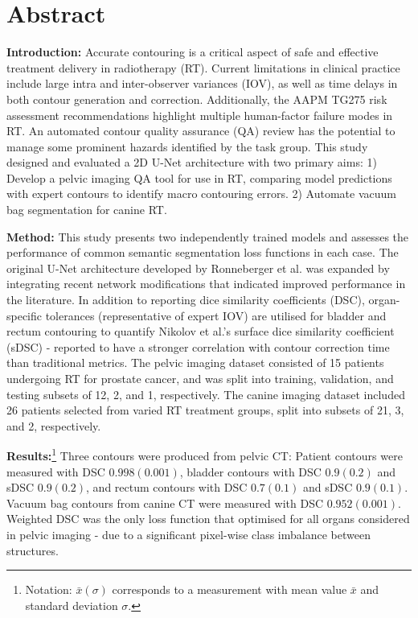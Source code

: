 \chapter{Abstract} \label{ch:abstract}

\textbf{Introduction:}
Accurate contouring is a critical aspect of safe and effective treatment
delivery in radiotherapy (RT). Current limitations in clinical practice include
large intra and inter-observer variances (IOV), as well as time delays in both
contour generation and correction. Additionally, the AAPM TG275 risk assessment
recommendations highlight multiple human-factor failure modes in RT. An
automated contour quality assurance (QA) review has the potential to manage some
prominent hazards identified by the task group. This study designed and
evaluated a 2D U-Net architecture with two primary aims: 1) Develop a pelvic
imaging QA tool for use in RT, comparing model predictions with expert
contours to identify macro contouring errors. 2) Automate vacuum bag
segmentation for canine RT.

\textbf{Method:}
This study presents two independently trained models and assesses the
performance of common semantic segmentation loss functions in each case. The
original U-Net architecture developed by Ronneberger et al. was expanded by
integrating recent network modifications that indicated improved performance in
the literature. In addition to reporting dice similarity coefficients (DSC),
organ-specific tolerances (representative of expert IOV) are utilised for
bladder and rectum contouring to quantify Nikolov et al.'s surface dice
similarity coefficient (sDSC) - reported to have a stronger correlation with
contour correction time than traditional metrics. The pelvic
imaging dataset consisted of 15 patients undergoing RT for prostate cancer, and
was split into training, validation, and testing subsets of 12, 2, and 1,
respectively. The canine imaging dataset included 26 patients selected from
varied RT treatment groups, split into subsets of 21, 3, and 2, respectively.

\textbf{Results:}\footnote{Notation: $\bar{x}(\sigma)$ corresponds to a
measurement with mean value $\bar{x}$ and standard deviation $\sigma$.} Three
contours were produced from pelvic CT: Patient contours were measured with DSC
$0.998(0.001)$, bladder contours with DSC $0.9(0.2)$ and sDSC $0.9(0.2)$, and
rectum contours with DSC $0.7(0.1)$ and sDSC $0.9(0.1)$. Vacuum bag contours
from canine CT were measured with DSC $0.952(0.001)$. Weighted DSC was the only
loss function that optimised for all organs considered in pelvic imaging -
due to a significant pixel-wise class imbalance between structures.

